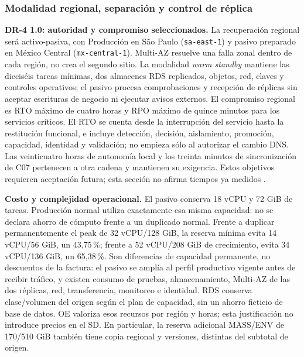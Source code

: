 \subsubsection{Modalidad regional, separación y control de réplica}
\label{sec:sd4-dr-modalidad-replica}

\textbf{DR-4 1.0: autoridad y compromiso seleccionados.} La recuperación regional será activo-pasiva, con Producción en São Paulo (\texttt{sa-east-1}) y pasivo preparado en México Central (\texttt{mx-central-1}). Multi-AZ resuelve una falla zonal dentro de cada región, no crea el segundo sitio. La modalidad \emph{warm standby} mantiene las dieciséis tareas mínimas, dos almacenes RDS replicados, objetos, red, claves y controles operativos; el pasivo procesa comprobaciones y recepción de réplicas sin aceptar escrituras de negocio ni ejecutar avisos externos. El compromiso regional es RTO máximo de cuatro horas y RPO máximo de quince minutos para los servicios críticos. El RTO se cuenta desde la interrupción del servicio hasta la restitución funcional, e incluye detección, decisión, aislamiento, promoción, capacidad, identidad y validación; no empieza sólo al autorizar el cambio DNS. Las veinticuatro horas de autonomía local y los treinta minutos de sincronización de C07 pertenecen a otra cadena y mantienen su exigencia. Estos objetivos requieren aceptación futura; esta sección no afirma tiempos ya medidos \parencites[RT-07.01--04, p.~17]{pucv-transversal}[cap.~15]{caso07}.

\textbf{Costo y complejidad operacional.} El pasivo conserva 18 vCPU y 72 GiB de tareas. Producción normal utiliza exactamente esa misma capacidad: no se declara ahorro de cómputo frente a un duplicado normal. Frente a duplicar permanentemente el peak de 32 vCPU/128 GiB, la reserva mínima evita 14 vCPU/56 GiB, un 43,75\,\%; frente a 52 vCPU/208 GiB de crecimiento, evita 34 vCPU/136 GiB, un 65,38\,\%. Son diferencias de capacidad permanente, no descuentos de la factura: el pasivo se amplía al perfil productivo vigente antes de recibir tráfico, y existen consumo de pruebas, almacenamiento, Multi-AZ de las dos réplicas, red, transferencia, monitoreo e identidad. RDS conserva clase/volumen del origen según el plan de capacidad, sin un ahorro ficticio de base de datos. OE valoriza esos recursos por región y horas; esta justificación no introduce precios en el SD. En particular, la reserva adicional MASS/ENV de 170/510 GiB también tiene copia regional y versiones, distintas del subtotal de origen.

